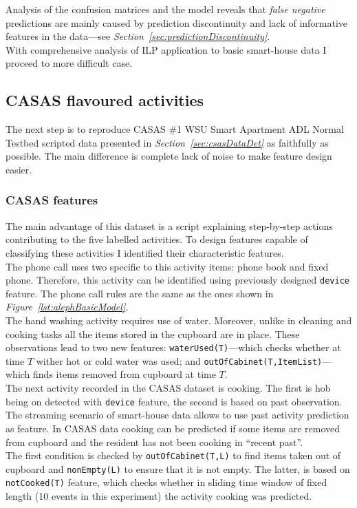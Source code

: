 \documentclass[10pt, a4paper, pdflatex, leqno, twoside, openright]{report}
\begin{document}
Analysis of the confusion matrices and the model reveals that \emph{false negative} predictions are mainly caused by prediction discontinuity and lack of informative features in the data---see \emph{Section~\ref{sec:predictionDiscontinuity}}.\\

With comprehensive analysis of ILP application to basic smart-house data I proceed to more difficult case.

    \subsection{CASAS flavoured activities\label{sec:CASASflavour}}
The next step is to reproduce CASAS \#1 WSU Smart Apartment ADL Normal Testbed scripted data presented in \emph{Section~\ref{sec:csasDataDet}} as faithfully as possible. The main difference is complete lack of noise to make feature design easier.

      \subsubsection{CASAS features}
The main advantage of this dataset is a script explaining step-by-step actions contributing to the five labelled activities. To design features capable of classifying these activities I identified their characteristic features.\\

The phone call uses two specific to this activity items: phone book and fixed phone. Therefore, this activity can be identified using previously designed \texttt{device} feature. The phone call rules are the same as the ones shown in \emph{Figure~\ref{lst:alephBasicModel}}.\\

The hand washing activity requires use of water. Moreover, unlike in cleaning and cooking tasks all the items stored in the cupboard are in place. These observations lead to two new features: \texttt{waterUsed(T)}---which checks whether at time $T$ wither hot or cold water was used; and \texttt{outOfCabinet(T,ItemList)}---which finds items removed from cupboard at time $T$.\\

The next activity recorded in the CASAS dataset is cooking. The first is hob being on detected with \texttt{device} feature, the second is based on past observation. The streaming scenario of smart-house data allows to use past activity prediction as feature. In CASAS data cooking can be predicted if some items are removed from cupboard and the resident has not been cooking in ``recent past''.\\
The first condition is checked by \texttt{outOfCabinet(T,L)} to find items taken out of cupboard and \texttt{nonEmpty(L)} to ensure that it is not empty. The latter, is based on \texttt{notCooked(T)} feature, which checks whether in sliding time window of fixed length (10 events in this experiment) the activity cooking was predicted.\\
\end{document}

